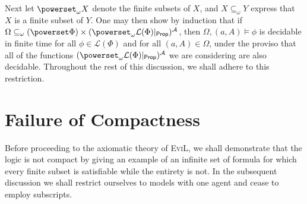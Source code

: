 \documentclass[11pt]{article}
\begin{document}
Next let $\powerset_\omega X$ denote the finite subsets of $X$, and $X \subseteq_\omega Y$ express 
that $X$ is a finite subset of $Y$.  One may then show by induction that if 
$\Omega \subseteq_\omega (\powerset \Phi) \times (\powerset_\omega \mathcal{L}(\Phi)|_{\mathsf{Prop}})^\mathcal{A}$, 
then $\Omega,(a,A) \models \phi$ is decidable in finite time for all 
$\phi \in \mathcal{L}(\Phi)$ and for all $(a,A) \in \Omega$, under the proviso that all of the functions $(\powerset_\omega \mathcal{L}(\Phi)|_{\mathsf{Prop}})^\mathcal{A}$ we are considering are also decidable.  Throughout the rest of this discussion, we shall adhere to this restriction.

\section{Failure of Compactness}

Before proceeding to the axiomatic theory of \textsc{EviL}, we shall demonstrate that the logic is not compact by giving an example of an infinite set of formula for which every finite subset is satisfiable while the entirety is not.  In the subsequent discussion we shall restrict ourselves to models with one agent and cease to employ subscripts.
\end{document}
